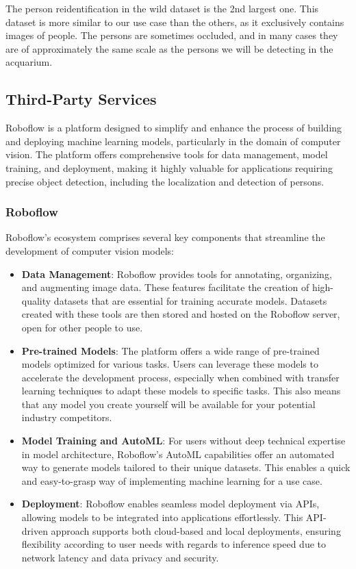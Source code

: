 The person reidentification in the wild dataset is the 2nd largest one. This dataset is more similar to our use case than the others, as it exclusively contains images of people. The persons are sometimes occluded, and in many cases they are of approximately the same scale as the persons we will be detecting in the acquarium.

\subsection{Third-Party Services}

Roboflow is a platform designed to simplify and enhance the process of building and deploying machine learning models, particularly in the domain of computer vision. The platform offers comprehensive tools for data management, model training, and deployment, making it highly valuable for applications requiring precise object detection, including the localization and detection of persons.

\subsubsection{Roboflow}

Roboflow's ecosystem comprises several key components that streamline the development of computer vision models:
\begin{itemize}
    \item \textbf{Data Management}: Roboflow provides tools for annotating, organizing, and augmenting image data. These features facilitate the creation of high-quality datasets that are essential for training accurate models. Datasets created with these tools are then stored and hosted on the Roboflow server, open for other people to use.
    \item \textbf{Pre-trained Models}: The platform offers a wide range of pre-trained models optimized for various tasks. Users can leverage these models to accelerate the development process, especially when combined with transfer learning techniques to adapt these models to specific tasks. This also means that any model you create yourself will be available for your potential industry competitors.
    \item \textbf{Model Training and AutoML}: For users without deep technical expertise in model architecture, Roboflow's AutoML capabilities offer an automated way to generate models tailored to their unique datasets. This enables a quick and easy-to-grasp way of implementing machine learning for a use case.
    \item \textbf{Deployment}: Roboflow enables seamless model deployment via APIs, allowing models to be integrated into applications effortlessly. This API-driven approach supports both cloud-based and local deployments, ensuring flexibility according to user needs with regards to inference speed due to network latency and data privacy and security.
\end{itemize}


